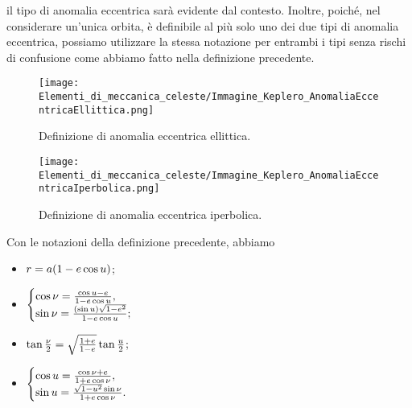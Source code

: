 il tipo di anomalia eccentrica sar\`a evidente dal contesto. Inoltre,
poich\'e, nel considerare un'unica orbita, \`e definibile al pi\`u  solo
uno dei due tipi di anomalia eccentrica, possiamo utilizzare la stessa
notazione per entrambi i tipi senza rischi di confusione come abbiamo
fatto nella definizione precedente.
\begin{figure}
	\texttt{[image: Elementi\_di\_meccanica\_celeste/Immagine\_Keplero\_AnomaliaEccentricaEllittica.png]}
	\centering
	\caption{Definizione di anomalia eccentrica ellittica.}
	\label{ElementiDiMeccanicaCeleste_Figura_AnomaliaEccentricaEllittica}
\end{figure}
\begin{figure}
	\texttt{[image: Elementi\_di\_meccanica\_celeste/Immagine\_Keplero\_AnomaliaEccentricaIperbolica.png]}
	\centering
	\caption{Definizione di anomalia eccentrica iperbolica.}
	\label{ElementiDiMeccanicaCeleste_Figura_AnomaliaEccentricaIperbolica}
\end{figure}
\begin{Theorem}
  \label{ElementiDiMeccanicaCeleste_ThTrueEccentric}
	Con le notazioni della definizione precedente, abbiamo
	\begin{itemize}
		\item $r = a(1 - e \cos{u})$;
		\item
		$
			\begin{cases}
				\cos{\nu}
          = \frac{\cos{u} - e}
              {1 - e \cos{u}},\\
				\sin{\nu}
          = \frac{(\sin{u})\sqrt{1 - e^2}}
            {1 - e \cos{u}}; 
			\end{cases}
		$
    \item $\tan \frac{\nu}{2}
            = \sqrt{\frac{1 + e}{1 - e}}
              \tan \frac{u}{2}$;
    \item
    $
      \begin{cases}
        \cos{u}
          = \frac{\cos{\nu} + e}
              {1 + e \cos{\nu}},\\
        \sin{u}
          = \frac{\sqrt{1 - u^2} \sin{\nu}}
              {1 + e \cos{\nu}}.
      \end{cases}
    $
	\end{itemize}
\end{Theorem}
